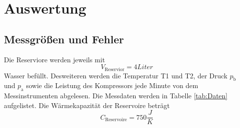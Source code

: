 \section{Auswertung}
\label{sec:Auswertung}
\subsection{Messgrößen und Fehler}
Die Reserviore werden jeweils mit 
\begin{equation}
  V_{\text{Reservior}} = 4 Liter
  \label{eqn:v}
\end{equation}
Wasser befüllt. Desweiteren werden die Temperatur T1 und T2, der Druck $p_{\text{b}}$ und $p_{\text{a}}$ sowie die Leistung des Kompressors jede Minute von dem Messinstrumenten abgelesen. Die Messdaten werden in Tabelle \ref{tab:Daten} aufgelistet. Die Wärmekapazität der Reservoire beträgt 
\begin{equation}
  C_{\text{Reservoire}} = 750 \frac{J}{K} 
  \label{eqn:c_re}
\end{equation}

